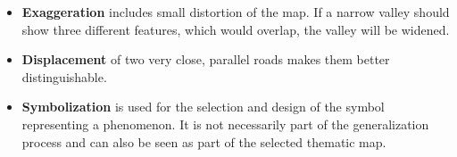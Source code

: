 \begin{itemize}
\item \textbf{Exaggeration} includes small distortion of the map. If a narrow valley should show three different features, which would overlap, the valley will be widened.

\item \textbf{Displacement} of two very close, parallel roads makes them better distinguishable.

\item \textbf{Symbolization} is used for the selection and design of the symbol representing a phenomenon. It is not necessarily part of the generalization process and can also be seen as part of the selected thematic map.

\end{itemize}
